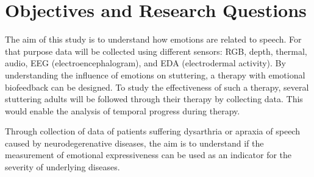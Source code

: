 \begin{comment}
The same setting could also be applied to patients with facial paralysis, caused by nerve damage. It usually occurs on only one side of the face and can have different degrees of severity which cause difficulty not only in speaking but also in eating and drinking. Although there are more than twenty grading methods of the severity of facial paralysis, they have defaults in integration, feasibility, accuracy, and reliability \cite{Dong2008}. The development of an accurate method for detection and grading of facial paralysis based on image processing would be beneficial to clinicians and patients.


For both, speech therapy and facial paralysis therapy, treatment takes several months of therapy sessions in which various exercises are performed to improve weakness in oral musculature. The video monitoring during therapy combined with the analysis of face muscle performance could help therapists to follow up the progress of each patient, compare patients with similar problems and even provide therapists with quantitative measurements. The inclusion of affective computing in the face analysis system, would accquire additional information of the patient's degree of engagement during the exercises being an additional factor to a successful therapy. Through the use of different sources of data such as health records, a multimodal time series of observations is used to develop a clinical decision support system that supports therapists in providing personalized therapies.

\end{comment}


\section{Objectives and Research Questions}
The aim of this study is to understand how emotions are related to speech. For that purpose data will be collected using different sensors: RGB, depth, thermal, audio, EEG (electroencephalogram), and EDA (electrodermal activity). 
By understanding the influence of emotions on stuttering, a therapy with emotional biofeedback can be designed. To study the effectiveness of such a therapy, several stuttering adults will be followed through their therapy by collecting data. This would enable the analysis of temporal progress during therapy.

Through collection of data of patients suffering dysarthria or apraxia of speech caused by neurodegerenative diseases, the aim is to understand if the measurement of emotional expressiveness can be used as an indicator for the severity of underlying diseases.

